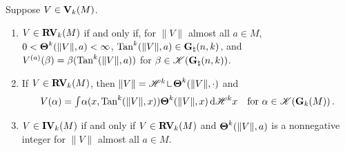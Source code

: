 \begin{theorem}
    \label{al:3.5(1)}
    Suppose $V \in \mathbf{V}_{k}(M)$.
    \begin{enumerate}
        \item $V \in \mathbf{RV}_{k}(M)$ if and only if, for $\|V\|$ almost all $a \in M$, $0 <
            \boldsymbol{\Theta}^{k}(\|V\|,a) < \infty$, $\operatorname{Tan}^{k}(\|V\|,a) \in \mathbf{G}_{\natural}(n,k)$,
            and $V^{(a)}(\beta) = \beta(\operatorname{Tan}^{k}(\|V\|,a))$ for $\beta \in
            \mathscr{K}(\mathbf{G}_{\natural}(n,k))$.
        \item If $V \in \mathbf{RV}_{k}(M)$, then $\|V\| = \HM^{\vdim} \restrict
            \density^{\vdim}(\|V\|,\cdot)$ and
            \begin{displaymath}
                V(\alpha) = {\textstyle\int_{}^{}} \alpha(x, \operatorname{Tan}^{k}(\|V\|,x)) \boldsymbol{\Theta}^{k}(\|V\|,x)
                \,\mathrm{d} \mathscr{H}^{k} x \quad \text{for $\alpha \in \mathscr{K}(\mathbf{G}_{k}(M))$} \,.
            \end{displaymath}
        \item $V \in \mathbf{IV}_{k}(M)$ if and only if $V \in \mathbf{RV}_{k}(M)$ and
            $\boldsymbol{\Theta}^{k}(\|V\|,a)$ is a nonnegative integer for $\|V\|$ almost all $a \in
            M$.
    \end{enumerate}
\end{theorem}

